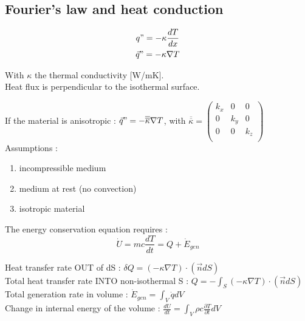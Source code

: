 \documentclass[../main.tex]{subfiles}
\begin{document}
\subsection{Fourier's law and heat conduction}

\begin{equation}
\begin{gathered}
    q" = -\kappa \frac{dT}{dx}\\
    \Vec{q}" = -\kappa \nabla T\\
    \end{gathered}
\end{equation}

With $\kappa$ the thermal conductivity [W/mK].\\
Heat flux is perpendicular to the isothermal surface. 

If the material is anisotropic : $\Vec{q}" = -\overline{\overline{\kappa}} \nabla T$, with $\overline{\overline{\kappa}} = \begin{pmatrix}
    k_x & 0 & 0\\
    0 & k_y & 0\\
    0 & 0 & k_z\\
\end{pmatrix}$\\

Assumptions : \begin{enumerate}
    \item incompressible medium\\
    \item medium at rest (no convection)\\
    \item isotropic material\\
\end{enumerate}


The energy conservation equation requires : \begin{equation}
    \dot{U} = mc\frac{dT}{dt} = Q+\dot{E}_{gen}
\end{equation}

Heat transfer rate OUT of dS : $\delta Q = (-\kappa \nabla T)\cdot (\Vec{n}dS)$\\

Total heat transfer rate INTO non-isothermal S : $Q = -\int_S (-\kappa \nabla T)\cdot (\Vec{n} dS)$\\
Total generation rate in volume : $\dot{E}_{gen} = \int_V \dot{q}dV$\\
Change in internal energy of the volume : $\frac{dU}{dt} = \int_V \rho c \frac{\partial T}{\partial t}dV$\\
\end{document}
